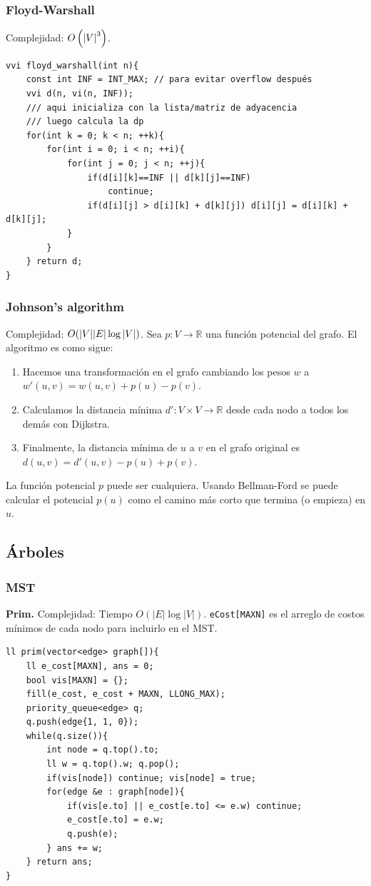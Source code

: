 \documentclass[12 pts,spanish,mexico]{article}
\numberwithin{equation}{section}
\newcommand{\R}{\mathbb{R}}
\newcommand{\pa}[1]{\left( #1 \right)}
\begin{document}
\begin{multicols}{2}
\subsubsection{Floyd-Warshall}
Complejidad: $O\pa{\abs{V}^3}$.
\begin{verbatim}
vvi floyd_warshall(int n){
    const int INF = INT_MAX; // para evitar overflow después
    vvi d(n, vi(n, INF));
    /// aqui inicializa con la lista/matriz de adyacencia
    /// luego calcula la dp
    for(int k = 0; k < n; ++k){
        for(int i = 0; i < n; ++i){
            for(int j = 0; j < n; ++j){
                if(d[i][k]==INF || d[k][j]==INF)
                    continue;
                if(d[i][j] > d[i][k] + d[k][j]) d[i][j] = d[i][k] + d[k][j];
            }
        }
    } return d;
}
\end{verbatim}

\subsubsection{Johnson's algorithm}
Complejidad: $O(\abs{V}\abs{E}\log\abs{V})$. Sea $p: V \to \R$ una función potencial del grafo. El algoritmo es como sigue:
\begin{enumerate}[1.]
    \item Hacemos una transformación en el grafo cambiando los pesos $w$ a $w'(u, v) = w(u, v) + p(u) - p(v)$.
    \item Calculamos la distancia mínima $d': V \times V \to \R$ desde cada nodo a todos los demás con Dijkstra.
    \item Finalmente, la distancia mínima de $u$ a $v$ en el grafo original es $d(u, v) = d'(u, v) - p(u) + p(v)$.
\end{enumerate}
La función potencial $p$ puede ser cualquiera. Usando Bellman-Ford se puede calcular el potencial $p(u)$ como el camino más corto que termina (o empieza) en $u$.

\subsection{Árboles}
\subsubsection{MST}
\textbf{Prim.} Complejidad: Tiempo $O(|E| \log |V|)$. \texttt{eCost[MAXN]} es el arreglo de costos mínimos de cada nodo para incluirlo en el MST.
\begin{verbatim}
ll prim(vector<edge> graph[]){
    ll e_cost[MAXN], ans = 0;
    bool vis[MAXN] = {};
    fill(e_cost, e_cost + MAXN, LLONG_MAX);
    priority_queue<edge> q;
    q.push(edge{1, 1, 0});
    while(q.size()){
        int node = q.top().to;
        ll w = q.top().w; q.pop();
        if(vis[node]) continue; vis[node] = true;
        for(edge &e : graph[node]){
            if(vis[e.to] || e_cost[e.to] <= e.w) continue;
            e_cost[e.to] = e.w;
            q.push(e);
        } ans += w;
    } return ans;
}
\end{verbatim}


\end{multicols}
\end{document}
